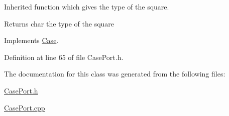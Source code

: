 Inherited function which gives the type of the square. 

\begin{DoxyReturn}{Returns}
char the type of the square 
\end{DoxyReturn}


Implements \hyperlink{class_case_a5a7b67b678313b5caab23868219f16b0}{Case}.



Definition at line 65 of file CasePort.h.



The documentation for this class was generated from the following files:\begin{DoxyCompactItemize}
\item 
\hyperlink{_case_port_8h}{CasePort.h}\item 
\hyperlink{_case_port_8cpp}{CasePort.cpp}\end{DoxyCompactItemize}
